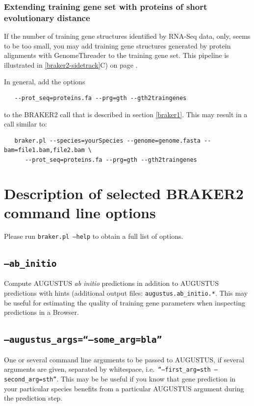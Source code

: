 \documentclass[a4paper,10pt]{report}
\begin{document}
\subsubsection{Extending training gene set with proteins of short evolutionary distance}

If the number of training gene structures identified by RNA-Seq data, only, seems to be too small, you may add training gene structures generated by protein alignments with GenomeThreader to the training gene set. This pipeline is illustrated in \ref{braker2-sidetrack}C) on page \pageref{braker2-sidetrack}.

In general, add the options

\begin{verbatim}
   --prot_seq=proteins.fa --prg=gth --gth2traingenes
\end{verbatim}

to the BRAKER2 call that is described in section \ref{braker1}. This may result in a call similar to:

\begin{verbatim}
   braker.pl --species=yourSpecies --genome=genome.fasta --bam=file1.bam,file2.bam \
      --prot_seq=proteins.fa --prg=gth --gth2traingenes
\end{verbatim}

\section{Description of selected BRAKER2 command line options}\label{options}

Please run \texttt{braker.pl --help} to obtain a full list of options.

\subsection{\texttt{--ab\_initio}}

Compute AUGUSTUS \textit{ab initio} predictions in addition to AUGUSTUS predictions with hints (additional output files: \texttt{augustus.ab\_initio.*}. This may be useful for estimating the quality of training gene parameters when inspecting predictions in a Browser.

\subsection{\texttt{--augustus\_args=``--some\_arg=bla''}}     
One or several command line arguments to be passed to AUGUSTUS, if several arguments are given, separated by whitespace, i.e.~\texttt{``--first\_arg=sth --second\_arg=sth''}. This may be be useful if you know that gene prediction in your particular species benefits from a particular AUGUSTUS argument during the prediction step.  
    
\end{document}
